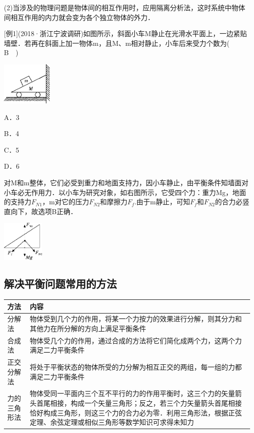 \documentclass[cn,10.5pt,chinese,mac,chinesefont=founder]{elegantbook}
\begin{document}
(2)当涉及的物理问题是物体间的相互作用时，应用隔离分析法，这时系统中物体间相互作用的内力就会变为各个独立物体的外力．

{[}例1{]}(2018·浙江宁波调研)如图所示，斜面小车M静止在光滑水平面上，一边紧贴墙壁．若再在斜面上加一物体m，且M、m相对静止，小车后来受力个数为(　B　)

\begin{center}\includegraphics[width=0.97917in,height=0.83333in]{media/image82.png}\end{center}

A．3 

B．4

C．5 

D．6
\begin{solution}
	对M和m整体，它们必受到重力和地面支持力，因小车静止，由平衡条件知墙面对小车必无作用力．以小车为研究对象，如右图所示，它受四个力：重力Mg，地面的支持力$F_{N1}$，m对它的压力$F_{N2}$和摩擦力$F_f$.由于m静止，可知$F_f$和$F_{N2}$的合力必竖直向下，故选项B正确．
\end{solution}

\begin{center}\includegraphics[width=0.8125in,height=0.79167in]{media/image83.png}\end{center}
\newpage
\subsection{解决平衡问题常用的方法}

\begin{longtable}[]{@{}m{2.5cm}m{10.5cm}@{}}
\toprule
方法 & 内容\tabularnewline
\midrule
\endhead
分解法 &
物体受到几个力的作用，将某一个力按力的效果进行分解，则其分力和其他力在所分解的方向上满足平衡条件\tabularnewline
合成法 &
物体受几个力的作用，通过合成的方法将它们简化成两个力，这两个力满足二力平衡条件\tabularnewline
正交分解法 &
将处于平衡状态的物体所受的力分解为相互正交的两组，每一组的力都满足二力平衡条件\tabularnewline
力的三角形法 &
物体受同一平面内三个互不平行的力的作用平衡时，这三个力的矢量箭头首尾相接，构成一个矢量三角形；反之，若三个力矢量箭头首尾相接恰好构成三角形，则这三个力的合力必为零．利用三角形法，根据正弦定理、余弦定理或相似三角形等数学知识可求得未知力\tabularnewline
\bottomrule
\end{longtable}
\end{document}

